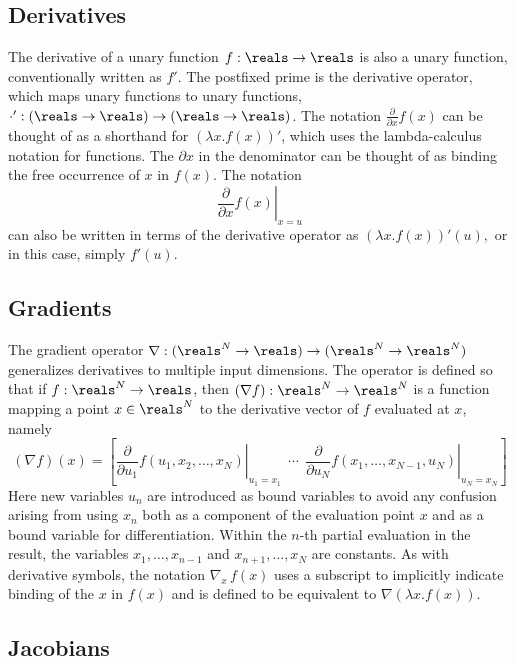 \documentclass[10pt]{article}
\begin{document}
\subsection{Derivatives}

The derivative of a unary function $f:\reals \rightarrow \reals$ is
also a unary function, conventionally written as $f'$.  The postfixed prime is
the derivative operator, which maps unary functions to unary
functions, $\cdot' : \left(\reals \rightarrow \reals\right)
\rightarrow \left(\reals \rightarrow \reals\right)$.  The notation
$\frac{\partial}{\partial x} f(x)$ can be thought of as a shorthand
for $\left( \lambda x. f(x) \right)'$, which uses the lambda-calculus
notation for functions. The $\partial x$ in the denominator can be
thought of as binding the free occurrence of $x$ in $f(x)$.  The
notation
\[
\left. \frac{\partial}{\partial x} f(x) \right|_{x = u}
\]
can also be written in terms of the derivative operator as $\left(
  \lambda x. f(x) \right)'(u),$ or in this case, simply $f'(u)$.

\subsection{Gradients}

The gradient operator $\nabla:(\reals^N \rightarrow \reals)\rightarrow
(\reals^N \rightarrow \reals^N)$ generalizes derivatives to multiple
input dimensions.  The operator is defined so that if
$f : \reals^N \rightarrow \reals$, then $(\nabla f):\reals^N \rightarrow
\reals^N$ is a function mapping a point $x \in \reals^N$ to the
derivative vector of $f$ evaluated at $x$, namely
%
\[
(\nabla f)(x) 
= 
\left[
  \left. 
    \frac{\partial}{\partial u_1} f(u_1,x_2,\ldots,x_N)
  \right|_{u_1 = x_1}
  \ \ \cdots \ \ 
  \left. 
    \frac{\partial}{\partial u_N}  f(x_1,\ldots,x_{N-1},u_N)
   \right|_{u_N = x_N}
\right]
\]
%
Here new variables $u_n$ are introduced as bound variables to avoid
any confusion arising from using $x_n$ both as a component of the
evaluation point $x$ and as a bound variable for differentiation.
Within the $n$-th partial evaluation in the result, the variables
$x_1,\ldots,x_{n-1}$ and $x_{n+1},\ldots,x_N$ are constants.  As with
derivative symbols, the notation $\nabla_{\!x} \, f(x)$ uses a
subscript to implicitly indicate binding of the $x$ in $f(x)$ and is
defined to be equivalent to $\nabla(\lambda x. f(x))$.

\subsection{Jacobians}
\end{document}
